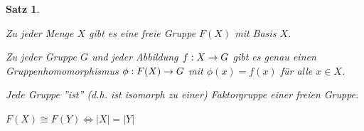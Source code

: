 \documentclass[a4paper,10pt,german]{scrbook}
\theoremstyle{saetze}
\newtheorem{Satz}{Satz}
\theoremstyle{definitionen}
\begin{document}
\begin{Satz}
\label{Satz 4}
    \mbox{}
    
    \begin{enum}
        \item Zu jeder Menge $X$ gibt es eine freie Gruppe $F(X)$ mit Basis $X$.

        \item Zu jeder Gruppe $G$ und jeder Abbildung $f: X \rightarrow G$ gibt es genau
        einen Gruppenhomomorphismus $\phi: F(X) \rightarrow G$ mit $\phi(x) = f(x)$ für
        alle $x \in X$.
        
        \item Jede Gruppe ''ist'' (d.h. ist isomorph zu einer) Faktorgruppe einer freien Gruppe.  
        \item $F(X) \cong F(Y) \Leftrightarrow |X| = |Y|$
                                

\end{enum}
\end{Satz}
\end{document}

